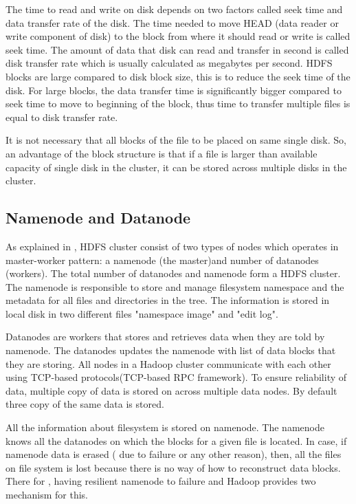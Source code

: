The time to read and write on disk depends on two factors called seek time and data transfer rate of the disk. The time needed to move HEAD (data reader or write component of disk) to the block from where it should read or write is called seek time. The amount of data that disk can read and transfer in second is called disk transfer rate which is usually calculated as megabytes per second. HDFS blocks are large compared to disk block size, this is to reduce the seek time of the disk. For large blocks, the data transfer time is significantly bigger compared to seek time to move to beginning of the block, thus time to transfer multiple files is equal to disk transfer rate.

It is not necessary that all blocks of the file to be placed on same single disk.  So, an advantage of the block structure is that if a file is larger than available capacity of single disk in the cluster, it can be stored across multiple disks in the cluster. 



\subsection{Namenode and Datanode}

As explained in \cite{tom3}, HDFS cluster consist of two types of nodes which operates in master-worker pattern: a namenode (the master)and number of datanodes (workers). The total number of datanodes and namenode form a HDFS cluster. The namenode is responsible to store and manage filesystem namespace and the metadata for all files and directories in the tree. The information is stored in local disk in two different files "namespace image" and "edit log".

  Datanodes are workers that stores and retrieves data when they are told by namenode. The datanodes updates the namenode with list of data blocks that they are storing. All nodes in a Hadoop cluster communicate with each other using TCP-based protocols(TCP-based RPC‌ framework). To ensure reliability of data, multiple copy of data is stored on across multiple data nodes. By default three copy of the same data is stored.
   

All the information about filesystem is stored on namenode. The namenode knows all the datanodes on which the blocks for a given file is located. In case, if namenode data is erased ( due to failure or any other reason), then, all the files on file system is lost because there is no way of how to reconstruct data blocks. There for , having resilient namenode to failure and Hadoop provides two mechanism for this.
 

